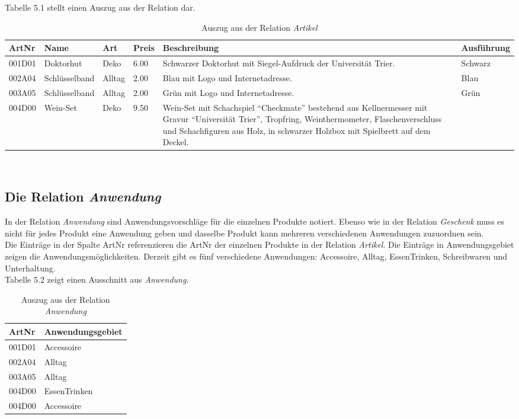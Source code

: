 Tabelle 5.1 stellt einen Auszug aus der Relation dar.
\begin{table}
\begin{center}
\begin{tabular}{|p{}|p{}|p{1cm}|p{}|p{}|p{}|}
	\hline
	ArtNr & Name & Art & Preis & Beschreibung & Ausführung \\ \hline
	001D01 & Doktorhut & Deko & 6.00 & Schwarzer Doktorhut mit Siegel-Aufdruck der Universität Trier. & Schwarz \\
	002A04 & Schlüsselband & Alltag & 2.00 & Blau mit Logo und Internetadresse. & Blau \\
	003A05 & Schlüsselband & Alltag & 2.00 & Grün mit Logo und Internetadresse. & Grün \\
	004D00 & Wein-Set & Deko & 9.50 & Wein-Set mit Schachspiel "`Checkmate"' bestehend aus Kellnermesser mit Gravur "`Universität Trier"', Tropfring, Weinthermometer, Flaschenverschluss und Schachfiguren aus Holz, in schwarzer Holzbox mit Spielbrett auf dem Deckel. & \\ \hline
	\end{tabular}
	\caption{Auszug aus der Relation \textit{Artikel}}
\end{center}
\label{BspArtikel}
\end{table}
\\


\subsection{Die Relation \textit{Anwendung}}
\label{sec:Anwendung}
In der Relation \textit{Anwendung} sind Anwendungsvorschläge für die einzelnen Produkte notiert. Ebenso wie in der Relation \textit{Geschenk} muss es nicht für jedes Produkt eine Anwendung geben und dasselbe Produkt kann mehreren verschiedenen Anwendungen zuzuordnen sein.\\
Die Einträge in der Spalte ArtNr referenzieren die ArtNr der einzelnen Produkte in der Relation \textit{Artikel}. Die Einträge in Anwendungsgebiet zeigen die Anwendungsmöglichkeiten. Derzeit gibt es fünf verschiedene Anwendungen: Accessoire, Alltag, EssenTrinken, Schreibwaren und Unterhaltung.\\
Tabelle 5.2 zeigt einen Ausschnitt aus \textit{Anwendung}.
\begin{table}
\begin{center}
\begin{tabular}{|p{}|p{4cm}|}
	\hline
	ArtNr & Anwendungsgebiet \\ \hline
	001D01 & Accessoire \\
	002A04 & Alltag \\
	003A05 & Alltag \\
	004D00 & EssenTrinken\\
	004D00 & Accessoire \\ \hline
	\end{tabular}
	\caption{Auszug aus der Relation \textit{Anwendung}}
\end{center}
\label{BspAnwendung}
\end{table}
\\


